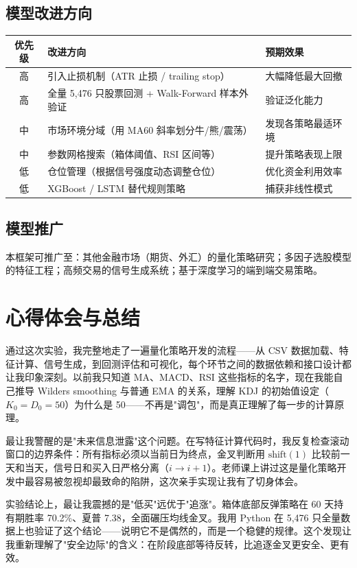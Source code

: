 \documentclass[12pt,a4paper]{ctexart}
\numberwithin{figure}{section}
\numberwithin{table}{section}
\begin{document}
\subsection{模型改进方向}
\begin{center}
\small
\begin{tabularx}{\textwidth}{c X l}
\toprule
优先级 & \centering 改进方向 & 预期效果 \\
\midrule
高 & 引入止损机制（ATR 止损 / trailing stop） & 大幅降低最大回撤 \\
高 & 全量 5,476 只股票回测 + Walk-Forward 样本外验证 & 验证泛化能力 \\
中 & 市场环境分域（用 MA60 斜率划分牛/熊/震荡） & 发现各策略最适环境 \\
中 & 参数网格搜索（箱体阈值、RSI 区间等） & 提升策略表现上限 \\
低 & 仓位管理（根据信号强度动态调整仓位） & 优化资金利用效率 \\
低 & XGBoost / LSTM 替代规则策略 & 捕获非线性模式 \\
\bottomrule
\end{tabularx}
\end{center}

\subsection{模型推广}
本框架可推广至：其他金融市场（期货、外汇）的量化策略研究；多因子选股模型的特征工程；高频交易的信号生成系统；基于深度学习的端到端交易策略。

\section{心得体会与总结}

通过这次实验，我完整地走了一遍量化策略开发的流程——从 CSV 数据加载、特征计算、信号生成，到回测评估和可视化，每个环节之间的数据依赖和接口设计都让我印象深刻。以前我只知道 MA、MACD、RSI 这些指标的名字，现在我能自己推导 Wilders smoothing 与普通 EMA 的关系，理解 KDJ 的初始值设定（$K_0=D_0=50$）为什么是 50——不再是"调包"，而是真正理解了每一步的计算原理。

最让我警醒的是"未来信息泄露"这个问题。在写特征计算代码时，我反复检查滚动窗口的边界条件：所有指标必须以当前日为终点，金叉判断用 $\text{shift}(1)$ 比较前一天和当天，信号日和买入日严格分离（$i \to i+1$）。老师课上讲过这是量化策略开发中最容易被忽视却最致命的陷阱，这次亲手实现让我有了切身体会。

实验结论上，最让我震撼的是"低买"远优于"追涨"。箱体底部反弹策略在 60 天持有期胜率 70.2\%、夏普 7.38，全面碾压均线金叉。我用 Python 在 5,476 只全量数据上也验证了这个结论——说明它不是偶然的，而是一个稳健的规律。这个发现让我重新理解了"安全边际"的含义：在阶段底部等待反转，比追逐金叉更安全、更有效。
\end{document}
